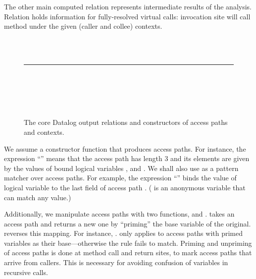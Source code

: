 The other main computed relation represents intermediate results of the analysis. Relation  holds information for fully-resolved virtual calls: invocation site  will call method  under the given (caller and collee) contexts.

\begin{figure}[hp]
\begin{datalog}
 \\
 \\
%
\noindent\rule{\textwidth}{0.5pt}\\
%
 \\
 \\
 \\
\end{datalog}
\caption[]{The core Datalog output relations and constructors of access paths and contexts.}
\label{fig:must-logic:output}
\end{figure}



We assume a constructor function  that produces access paths. For instance, the expression ``'' means that the access path  has length 3 and its elements are given by the values of bound logical variables ,  and . We shall also use  as a pattern matcher over access paths. For example, the expression ``'' binds the value of logical variable  to the last field of access path . (\args{\_} is an anonymous variable that can match any value.)

Additionally, we manipulate access paths with two functions,  and .  takes an access path and returns a new one by ``priming'' the base variable of the original.  reverses this mapping. For instance, .  only applies to access paths with primed variables as their base---otherwise the rule fails to match. Priming and unpriming of access paths is done at method call and return sites, to mark access paths that arrive from callers. This is necessary for avoiding confusion of variables in recursive calls.

